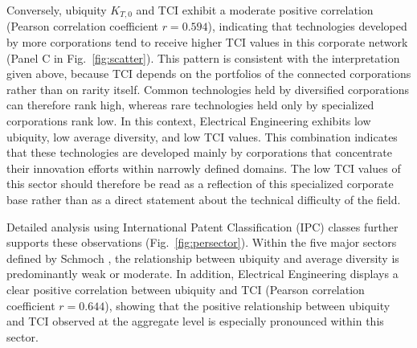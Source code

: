 \documentclass[lineno,pdflatex,sn-mathphys-num]{sn-jnl}%
\theoremstyle{thmstyleone}%
\theoremstyle{thmstyletwo}%
\theoremstyle{thmstylethree}%
\begin{document}
Conversely, ubiquity $K_{T,0}$ and TCI exhibit a moderate positive correlation (Pearson correlation coefficient $r=0.594$), indicating that technologies developed by more corporations tend to receive higher TCI values in this corporate network (Panel C in Fig.~\ref{fig:scatter}).
This pattern is consistent with the interpretation given above, because TCI depends on the portfolios of the connected corporations rather than on rarity itself.
Common technologies held by diversified corporations can therefore rank high, whereas rare technologies held only by specialized corporations rank low.
In this context, Electrical Engineering exhibits low ubiquity, low average diversity, and low TCI values.
This combination indicates that these technologies are developed mainly by corporations that concentrate their innovation efforts within narrowly defined domains.
The low TCI values of this sector should therefore be read as a reflection of this specialized corporate base rather than as a direct statement about the technical difficulty of the field.

Detailed analysis using International Patent Classification (IPC) classes further supports these observations (Fig.~\ref{fig:persector}).
Within the five major sectors defined by Schmoch \cite{Schmoch2008}, the relationship between ubiquity and average diversity is predominantly weak or moderate.
In addition, Electrical Engineering displays a clear positive correlation between ubiquity and TCI (Pearson correlation coefficient $r=0.644$), showing that the positive relationship between ubiquity and TCI observed at the aggregate level is especially pronounced within this sector.
\end{document}
